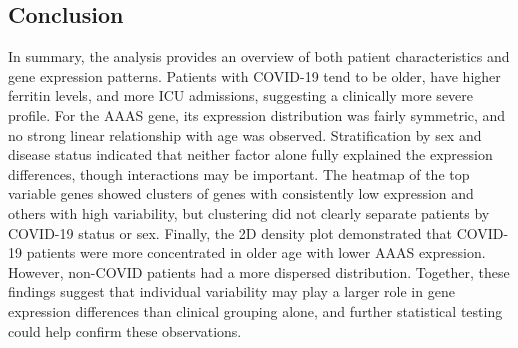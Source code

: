\documentclass{article}
\begin{document}
\subsection{Conclusion}

In summary, the analysis provides an overview of both patient characteristics and gene expression patterns. Patients with COVID-19 tend to be older, have higher ferritin levels, and more ICU admissions, suggesting a clinically more severe profile. For the AAAS gene, its expression distribution was fairly symmetric, and no strong linear relationship with age was observed. Stratification by sex and disease status indicated that neither factor alone fully explained the expression differences, though interactions may be important. The heatmap of the top variable genes showed clusters of genes with consistently low expression and others with high variability, but clustering did not clearly separate patients by COVID-19 status or sex. Finally, the 2D density plot demonstrated that COVID-19 patients were more concentrated in older age with lower AAAS expression. However, non-COVID patients had a more dispersed distribution. Together, these findings suggest that individual variability may play a larger role in gene expression differences than clinical grouping alone, and further statistical testing could help confirm these observations.

\printbibliography
\end{document}
